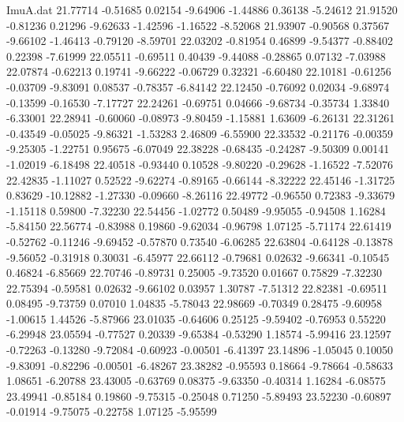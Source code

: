 \begin{filecontents}{ImuA.dat}
  21.77714   -0.51685    0.02154   -9.64906   -1.44886    0.36138   -5.24612
  21.91520   -0.81236    0.21296   -9.62633   -1.42596   -1.16522   -8.52068
  21.93907   -0.90568    0.37567   -9.66102   -1.46413   -0.79120   -8.59701
  22.03202   -0.81954    0.46899   -9.54377   -0.88402    0.22398   -7.61999
  22.05511   -0.69511    0.40439   -9.44088   -0.28865    0.07132   -7.03988
  22.07874   -0.62213    0.19741   -9.66222   -0.06729    0.32321   -6.60480
  22.10181   -0.61256   -0.03709   -9.83091    0.08537   -0.78357   -6.84142
  22.12450   -0.76092    0.02034   -9.68974   -0.13599   -0.16530   -7.17727
  22.24261   -0.69751    0.04666   -9.68734   -0.35734    1.33840   -6.33001
  22.28941   -0.60060   -0.08973   -9.80459   -1.15881    1.63609   -6.26131
  22.31261   -0.43549   -0.05025   -9.86321   -1.53283    2.46809   -6.55900
  22.33532   -0.21176   -0.00359   -9.25305   -1.22751    0.95675   -6.07049
  22.38228   -0.68435   -0.24287   -9.50309    0.00141   -1.02019   -6.18498
  22.40518   -0.93440    0.10528   -9.80220   -0.29628   -1.16522   -7.52076
  22.42835   -1.11027    0.52522   -9.62274   -0.89165   -0.66144   -8.32222
  22.45146   -1.31725    0.83629  -10.12882   -1.27330   -0.09660   -8.26116
  22.49772   -0.96550    0.72383   -9.33679   -1.15118    0.59800   -7.32230
  22.54456   -1.02772    0.50489   -9.95055   -0.94508    1.16284   -5.84150
  22.56774   -0.83988    0.19860   -9.62034   -0.96798    1.07125   -5.71174
  22.61419   -0.52762   -0.11246   -9.69452   -0.57870    0.73540   -6.06285
  22.63804   -0.64128   -0.13878   -9.56052   -0.31918    0.30031   -6.45977
  22.66112   -0.79681    0.02632   -9.66341   -0.10545    0.46824   -6.85669
  22.70746   -0.89731    0.25005   -9.73520    0.01667    0.75829   -7.32230
  22.75394   -0.59581    0.02632   -9.66102    0.03957    1.30787   -7.51312
  22.82381   -0.69511    0.08495   -9.73759    0.07010    1.04835   -5.78043
  22.98669   -0.70349    0.28475   -9.60958   -1.00615    1.44526   -5.87966
  23.01035   -0.64606    0.25125   -9.59402   -0.76953    0.55220   -6.29948
  23.05594   -0.77527    0.20339   -9.65384   -0.53290    1.18574   -5.99416
  23.12597   -0.72263   -0.13280   -9.72084   -0.60923   -0.00501   -6.41397
  23.14896   -1.05045    0.10050   -9.83091   -0.82296   -0.00501   -6.48267
  23.38282   -0.95593    0.18664   -9.78664   -0.58633    1.08651   -6.20788
  23.43005   -0.63769    0.08375   -9.63350   -0.40314    1.16284   -6.08575
  23.49941   -0.85184    0.19860   -9.75315   -0.25048    0.71250   -5.89493
  23.52230   -0.60897   -0.01914   -9.75075   -0.22758    1.07125   -5.95599

\end{filecontents}
